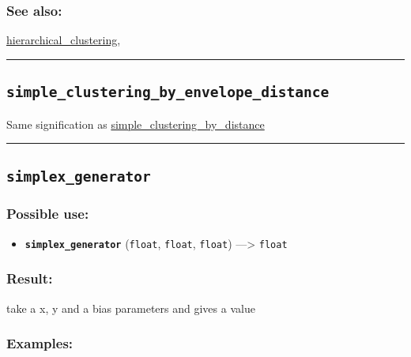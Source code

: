 \documentclass[]{book}
\providecommand{\tightlist}{%
  \setlength{\itemsep}{0pt}\setlength{\parskip}{0pt}}
\theoremstyle{definition}
\theoremstyle{definition}
\theoremstyle{definition}
\theoremstyle{remark}
\begin{document}
\subsubsection{See also:}\label{see-also-184}

\href{OperatorsDH\#hierarchical_clustering}{hierarchical\_clustering},

\begin{center}\rule{0.5\linewidth}{\linethickness}\end{center}

\subsection{\texorpdfstring{\texttt{simple\_clustering\_by\_envelope\_distance}}{simple\_clustering\_by\_envelope\_distance}}\label{simple_clustering_by_envelope_distance}

Same signification as
\href{OperatorsSZ\#simple_clustering_by_distance}{simple\_clustering\_by\_distance}

\begin{center}\rule{0.5\linewidth}{\linethickness}\end{center}

\subsection{\texorpdfstring{\texttt{simplex\_generator}}{simplex\_generator}}\label{simplex_generator}

\subsubsection{Possible use:}\label{possible-use-474}

\begin{itemize}
\tightlist
\item
  \textbf{\texttt{simplex\_generator}} (\texttt{float}, \texttt{float},
  \texttt{float}) ---\textgreater{} \texttt{float}
\end{itemize}

\subsubsection{Result:}\label{result-458}

take a x, y and a bias parameters and gives a value

\subsubsection{Examples:}\label{examples-330}
\end{document}
